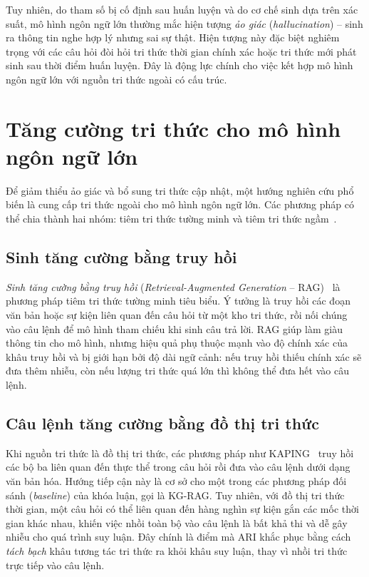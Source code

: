 Tuy nhiên, do tham số bị cố định sau huấn luyện và do cơ chế sinh dựa trên xác suất, mô hình ngôn
ngữ lớn thường mắc hiện tượng \textit{ảo giác} (\textit{hallucination}) -- sinh ra thông tin nghe
hợp lý nhưng sai sự thật. Hiện tượng này đặc biệt nghiêm trọng với các câu hỏi đòi hỏi tri thức
thời gian chính xác hoặc tri thức mới phát sinh sau thời điểm huấn luyện. Đây là động lực chính
cho việc kết hợp mô hình ngôn ngữ lớn với nguồn tri thức ngoài có cấu trúc.

\section{Tăng cường tri thức cho mô hình ngôn ngữ lớn}
\label{sec:rag}

Để giảm thiểu ảo giác và bổ sung tri thức cập nhật, một hướng nghiên cứu phổ biến là cung cấp tri
thức ngoài cho mô hình ngôn ngữ lớn. Các phương pháp có thể chia thành hai nhóm: tiêm tri thức
tường minh và tiêm tri thức ngầm~\cite{baek2023kaping}.

\subsection{Sinh tăng cường bằng truy hồi}

\textit{Sinh tăng cường bằng truy hồi} (\textit{Retrieval-Augmented Generation} --
RAG)~\cite{lewis2020rag} là phương pháp tiêm tri thức tường minh tiêu biểu. Ý tưởng là truy hồi
các đoạn văn bản hoặc sự kiện liên quan đến câu hỏi từ một kho tri thức, rồi nối chúng vào câu
lệnh để mô hình tham chiếu khi sinh câu trả lời. RAG giúp làm giàu thông tin cho mô hình, nhưng
hiệu quả phụ thuộc mạnh vào độ chính xác của khâu truy hồi và bị giới hạn bởi độ dài ngữ cảnh: nếu
truy hồi thiếu chính xác sẽ đưa thêm nhiễu, còn nếu lượng tri thức quá lớn thì không thể đưa hết
vào câu lệnh.

\subsection{Câu lệnh tăng cường bằng đồ thị tri thức}

Khi nguồn tri thức là đồ thị tri thức, các phương pháp như KAPING~\cite{baek2023kaping} truy hồi
các bộ ba liên quan đến thực thể trong câu hỏi rồi đưa vào câu lệnh dưới dạng văn bản hóa. Hướng
tiếp cận này là cơ sở cho một trong các phương pháp đối sánh (\textit{baseline}) của khóa luận, gọi
là KG-RAG. Tuy nhiên, với đồ thị tri thức thời gian, một câu hỏi có thể liên quan đến hàng nghìn
sự kiện gắn các mốc thời gian khác nhau, khiến việc nhồi toàn bộ vào câu lệnh là bất khả thi và dễ
gây nhiễu cho quá trình suy luận. Đây chính là điểm mà ARI khắc phục bằng cách \emph{tách bạch}
khâu tương tác tri thức ra khỏi khâu suy luận, thay vì nhồi tri thức trực tiếp vào câu lệnh.


